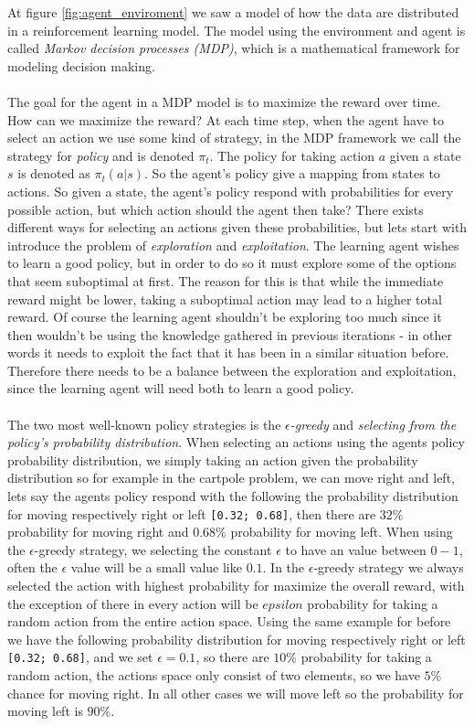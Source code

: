 \documentclass[11pt]{article}
\begin{document}
At figure \ref{fig:agent_enviroment} we saw a model of how the data are distributed in a reinforcement learning model. The model using the environment and agent is called \textit{Markov decision processes (MDP)}, which is a mathematical framework for modeling decision making. 
\\ \\
The goal for the agent in a MDP model is to maximize the reward over time. How can we maximize the reward? At each time step, when the agent have to select an action we use some kind of strategy, in the MDP framework we call the strategy for \textit{policy} and is denoted $\pi_{t}$. The policy for taking action $a$ given a state $s$ is denoted as $\pi_{t}(a|s)$. So the agent's policy give a mapping from states to actions.
So given a state, the agent's policy respond with probabilities for every possible action, but which action should the agent then take? There exists different ways for selecting an actions given these probabilities, but lets start with introduce the problem of \textit{exploration} and \textit{exploitation}.
The learning agent wishes to learn a good policy, but in order to do so it must explore
some of the options that seem suboptimal at first.
The reason for this is that while the immediate reward might be lower, taking a
suboptimal action may lead to a higher total reward.
Of course the learning agent shouldn't be exploring too much since it then wouldn't
be using the knowledge gathered in previous iterations - in other words it needs to
exploit the fact that it has been in a similar situation before.
Therefore there needs to be a balance between the exploration and exploitation, since
the learning agent will need both to learn a good policy.
\\ \\
The two most well-known policy strategies is the \textit{$\epsilon$-greedy} and \textit{selecting from the policy's probability distribution}. When selecting an actions using the agents policy probability distribution, we simply taking an action given the probability distribution so for example in the cartpole problem, we can move right and left, lets say the agents policy respond with the following the probability distribution for moving respectively right or left \texttt{[0.32; 0.68]}, then there are $32\%$ probability for moving right and $0.68\%$ probability for moving left.
When using the $\epsilon$-greedy strategy, we selecting the constant $\epsilon$ to have an value between $0 - 1$, often the $\epsilon$ value will be a small value like $0.1$.
In the $\epsilon$-greedy strategy we always selected the action with highest probability for maximize the overall reward, with the exception of there in every action will be $epsilon$ probability for taking a random action from the entire action space. Using the same example for before we have the following probability distribution for moving respectively right or left \texttt{[0.32; 0.68]}, and we set $\epsilon = 0.1$, so there are $10\%$ probability for taking a random action, the actions space only consist of two elements, so we have $5\%$ chance for moving right. In all other cases we will move left so the probability for moving left is $90\%$.
\end{document}
